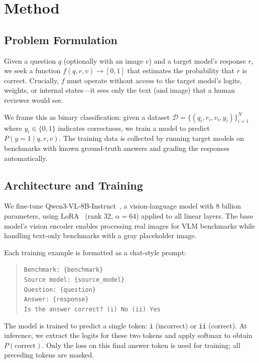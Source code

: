 \documentclass{colm2026}
\begin{document}
\section{Method}
\label{sec:method}

\subsection{Problem Formulation}

Given a question $q$ (optionally with an image $v$) and a target model's response $r$, we seek a function $f(q, r, v) \to [0, 1]$ that estimates the probability that $r$ is correct. Crucially, $f$ must operate without access to the target model's logits, weights, or internal states---it sees only the text (and image) that a human reviewer would see.

We frame this as binary classification: given a dataset $\mathcal{D} = \{(q_i, r_i, v_i, y_i)\}_{i=1}^N$ where $y_i \in \{0, 1\}$ indicates correctness, we train a model to predict $P(y = 1 \mid q, r, v)$. The training data is collected by running target models on benchmarks with known ground-truth answers and grading the responses automatically.

\subsection{Architecture and Training}

We fine-tune Qwen3-VL-8B-Instruct~\citep{qwen3vl}, a vision-language model with 8 billion parameters, using LoRA~\citep{hu2022lora} (rank 32, $\alpha = 64$) applied to all linear layers. The base model's vision encoder enables processing real images for VLM benchmarks while handling text-only benchmarks with a gray placeholder image.

Each training example is formatted as a chat-style prompt:

\begin{quote}
\small
\texttt{Benchmark: \{benchmark\}} \\
\texttt{Source model: \{source\_model\}} \\[2pt]
\texttt{Question: \{question\}} \\[2pt]
\texttt{Answer: \{response\}} \\[2pt]
\texttt{Is the answer correct? (i) No (ii) Yes}
\end{quote}

\noindent The model is trained to predict a single token: \texttt{i} (incorrect) or \texttt{ii} (correct). At inference, we extract the logits for these two tokens and apply softmax to obtain $P(\text{correct})$. Only the loss on this final answer token is used for training; all preceding tokens are masked.
\end{document}
